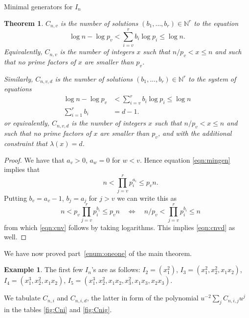 \documentclass[reqno,10pt]{amsart}
\theoremstyle{definition}
\newtheorem{example}[definition]{Example}
\theoremstyle{remark}
\theoremstyle{plain}
\newtheorem{theorem}[definition]{Theorem}
\newcommand{\Nat}{{\mathbb{N}}}
\begin{document}
\begin{section}{Minimal generators for \(I_n\)}
\begin{figure}[p]
\begin{center}
{      }
    \end{center}
  \end{figure}

  \begin{theorem}\label{thm:cnv}
    \(C_{n,v}\) is the number of solutions \((b_1,\dots,b_r) \in
    \Nat^r\) to the equation
    \begin{equation}
      \label{eqn:cnv}
      \log n - \log p_v < \sum_{i=v}^r b_i \log p_i \le \log n.
    \end{equation}
    Equivalently, \(C_{n,v}\) is the number of integers \(x\) such that
    \(n/p_v < x \le n\) and such that no prime factors of \(x\) are smaller
    than \(p_v\). 

    Similarly,
    \(C_{n,v,d}\) is the number of solutions \((b_1,\dots,b_r) \in
    \Nat^r\) to the system of equations
    \begin{equation}
      \label{eqn:cnvd}
      \begin{split}
      \log n - \log p_v & < \sum_{i=v}^r b_i \log p_i \le \log n \\
      \sum_{i=1}^r b_i &= d-1.
      \end{split}
    \end{equation}
    or equivalently, \(C_{n,v,d}\) is the number of integers \(x\) such that
    \(n/p_v < x \le n\) and such that  no prime factors of \(x\) are smaller
    than \(p_v\), and with the additional constraint that
    \(\lambda(x)=d\). 
  \end{theorem}
  \begin{proof}
    We have that \(a_v >0\), \(a_w = 0\) for \(w < v\). Hence
    equation \eqref{eqn:mingen} implies that
    \begin{displaymath}
      \quad n < \prod_{j=v}^r p_i^{a_i} \le p_v n.
    \end{displaymath}
    Putting \(b_v = a_v - 1\), \(b_j = a_j\) for \(j > v\) we can
    write this as
    \begin{displaymath}
      \quad n < p_v \prod_{j=v}^r p_i^{b_i} \le p_v n \quad \iff \quad
      n/p_v <  \prod_{j=v}^r p_i^{b_i} \le n 
    \end{displaymath}
    from which \eqref{eqn:cnv} follows by taking logarithms. This
    implies \eqref{eqn:cnvd} as well.
  \end{proof}
  We have now proved  part~\ref{enum:oneone}     of the main theorem.
  \begin{example}
  The first few \(I_n\)'s are as follows: \(I_2 = (x_1^2)\),
  \(I_3 = (x_1^2,x_2^2,x_1x_2)\), \(I_4 =  (x_1^3,x_2^2,x_1x_2)\),
  \(I_5 = (x_1^3,x_2^2,x_1x_2,x_3^2,x_1x_3, x_2x_3)\).
  \end{example}
  We tabulate \(C_{n,i}\) and \(C_{n,i,d}\), the latter in form of the
  polynomial \(u^{-2}\sum_j C_{n,i,j} u^j\) in the tables \ref{fig:Cni} and
  \ref{fig:Cnig}.


\end{section}
\end{document}
